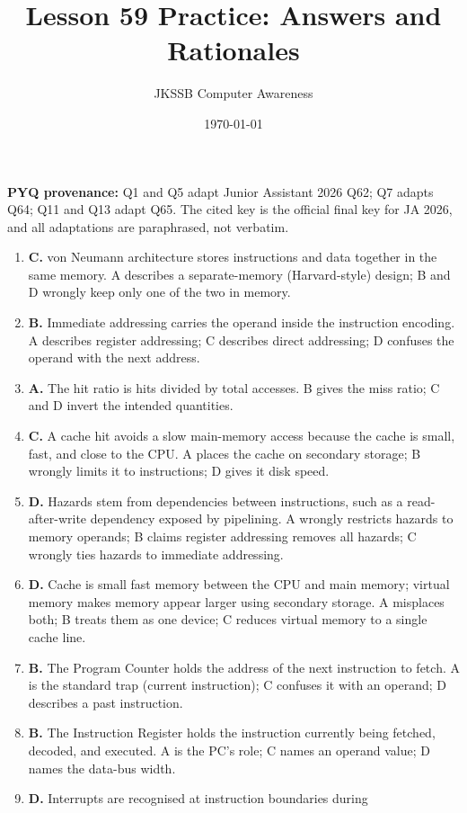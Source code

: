 \documentclass[11pt]{article}
\title{Lesson 59 Practice: Answers and Rationales}
\author{JKSSB Computer Awareness}
\date{\today}
\begin{document}
\maketitle
\noindent\textbf{PYQ provenance:} Q1 and Q5 adapt Junior Assistant 2026 Q62;
Q7 adapts Q64; Q11 and Q13 adapt Q65. The cited key is the official final key
for JA 2026, and all adaptations are paraphrased, not verbatim.
\begin{enumerate}[label=\textbf{Q\arabic*.}, leftmargin=*]
\item \textbf{C.} von Neumann architecture stores instructions and data
  together in the same memory. A describes a separate-memory (Harvard-style)
  design; B and D wrongly keep only one of the two in memory.
\item \textbf{B.} Immediate addressing carries the operand inside the
  instruction encoding. A describes register addressing; C describes direct
  addressing; D confuses the operand with the next address.
\item \textbf{A.} The hit ratio is hits divided by total accesses. B gives the
  miss ratio; C and D invert the intended quantities.
\item \textbf{C.} A cache hit avoids a slow main-memory access because the
  cache is small, fast, and close to the CPU. A places the cache on secondary
  storage; B wrongly limits it to instructions; D gives it disk speed.
\item \textbf{D.} Hazards stem from dependencies between instructions, such as
  a read-after-write dependency exposed by pipelining. A wrongly restricts
  hazards to memory operands; B claims register addressing removes all
  hazards; C wrongly ties hazards to immediate addressing.
\item \textbf{D.} Cache is small fast memory between the CPU and main memory;
  virtual memory makes memory appear larger using secondary storage. A
  misplaces both; B treats them as one device; C reduces virtual memory to a
  single cache line.
\item \textbf{B.} The Program Counter holds the address of the next
  instruction to fetch. A is the standard trap (current instruction); C
  confuses it with an operand; D describes a past instruction.
\item \textbf{B.} The Instruction Register holds the instruction currently
  being fetched, decoded, and executed. A is the PC's role; C names an operand
  value; D names the data-bus width.
\item \textbf{D.} Interrupts are recognised at instruction boundaries during

\end{enumerate}
\end{document}
